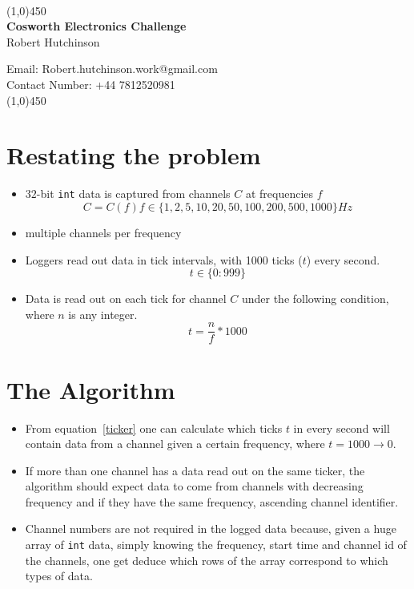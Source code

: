 \documentclass{article}
\begin{document}
	\begin{center}
		{\color{white}{space}}\vspace{- 2 cm}\\
		\line(1,0){450}\\
		\Large{\textbf{Cosworth Electronics Challenge\\}}
		\large{Robert Hutchinson}
		
		\normalsize{Email: Robert.hutchinson.work@gmail.com\\Contact Number: +44 7812520981\\
		}
		\line(1,0){450}\\
	\end{center}
	\part{Restating the problem}
	\begin{itemize}
		\item $32$-bit \texttt{int} data is captured from channels $C$ at frequencies $f$
		\begin{equation}\label{f_range}
		C = C(f)	f \in \{1,2,5,10,20,50,100,200,500,1000\} Hz
		\end{equation}
		\item multiple channels per frequency
		\item Loggers read out data in tick intervals, with 1000 ticks ($t$) every second.
		\begin{equation}\label{t_range}
		t \in \{0:999\}
		\end{equation}
		\item Data is read out on each tick for channel $C$ under the following condition, where $n$ is any integer.
		\begin{equation}\label{ticker}
		t = \frac{n}{f}*1000
		\end{equation}
	\end{itemize}
	
	\part{The Algorithm}
	\begin{itemize}
		\item From equation~\ref{ticker} one can calculate which ticks $t$ in every second will contain data from a channel given a certain frequency, where $t = 1000 \rightarrow 0$.
		\item If more than one channel has a data read out on the same ticker, the algorithm should expect data to come from channels with decreasing frequency and if they have the same frequency, ascending channel identifier.
		\item Channel numbers are not required in the logged data because, given a huge array of \texttt{int} data, simply knowing the frequency, start time and channel id of the channels, one get deduce which rows of the array correspond to which types of data.
	\end{itemize}
\end{document}
